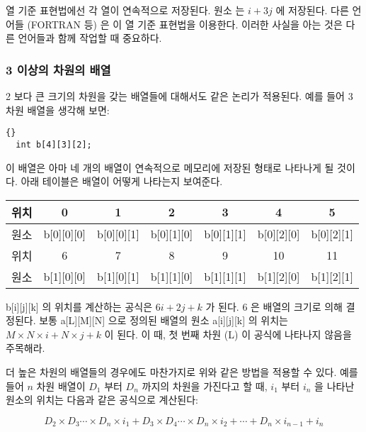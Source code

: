 열 기준 표현법에선 각 열이 연속적으로 저장된다. 원소 {\code [i][j]} 는
$i+3j$ 에 저장된다. 다른 언어들 (FORTRAN 등) 은 이 열 기준 표현법을 
이용한다. 이러한 사실을 아는 것은 다른 언어들과 함께 작업할 때 중요하다. 


\subsubsection{3 이상의 차원의 배열}

2 보다 큰 크기의 차원을 갖는 배열들에 대해서도 같은 논리가 적용된다.
예를 들어 3 차원 배열을 생각해 보면:

\begin{lstlisting}[stepnumber=0]{}
  int b[4][3][2];
\end{lstlisting}

이 배열은 아마 네 개의 {\code [3][2]} 배열이 연속적으로 메모리에 저장된 형태로
나타나게 될 것이다. 아래 테이블은 배열이 어떻게 나타는지 보여준다.  

\parbox{\textwidth}{
\vspace{0.5em}
\centering
\begin{tabular}{||l|c|c|c|c|c|c||}
\hline
위치 & 0 & 1 & 2 & 3 & 4 & 5  \\
\hline
원소 & b[0][0][0] & b[0][0][1]  & b[0][1][0] & b[0][1][1] & b[0][2][0]
&  b[0][2][1]  \\
\hline
\hline
위치 & 6 & 7 & 8 & 9 & 10 & 11 \\
\hline
원소 & b[1][0][0] & b[1][0][1] & b[1][1][0] & b[1][1][1]  & b[1][2][0] 
& b[1][2][1] \\
\hline
\end{tabular}
\vspace{0.5em}
}
\noindent 
{\code b[i][j][k]} 의 위치를 계산하는 공식은 $6i+2j+k$ 가 된다.
6 은 {\code [3][2]} 배열의 크기로 의해 결정된다. 보통 {\code a[L][M][N]} 으로 정의된
배열의 원소 {\code a[i][j][k]} 의 위치는 $M\times N\times i + N \times j + k$ 이 된다. 이 때,
첫 번째 차원 ({\code L}) 이 공식에 나타나지 않음을 주목해라. 

더 높은 차원의 배열들의 경우에도 마찬가지로 위와 같은 방법을 적용할 수 있다. 예를 들어
$n$ 차원 배열이 $D_1$ 부터 $D_n$ 까지의 차원을 가진다고 할 때, $i_1$ 부터 $i_n$ 을 나타난
원소의 위치는 다음과 같은 공식으로 계산된다:

\begin{displaymath}
D_2 \times D_3 \cdots \times D_n \times i_1 + D_3 \times D_4 \cdots \times D_n 
\times i_2 + \cdots + D_n \times i_{n-1} + i_n
\end{displaymath}


